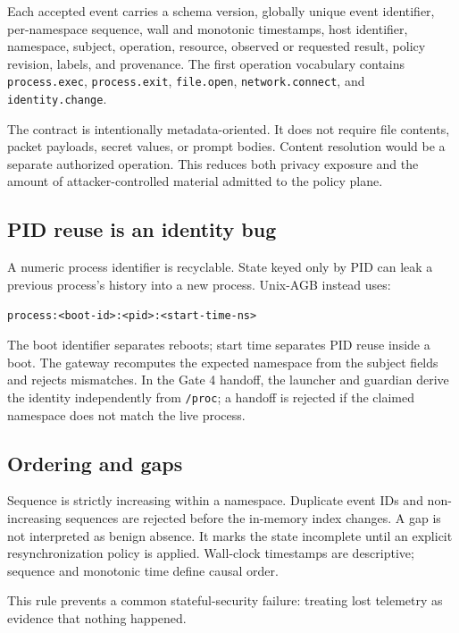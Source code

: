 \documentclass[11pt,a4paper]{article}
\begin{document}
Each accepted event carries a schema version, globally unique event identifier,
per-namespace sequence, wall and monotonic timestamps, host identifier,
namespace, subject, operation, resource, observed or requested result, policy
revision, labels, and provenance. The first operation vocabulary contains
\texttt{process.exec}, \texttt{process.exit}, \texttt{file.open},
\texttt{network.connect}, and \texttt{identity.change}.

The contract is intentionally metadata-oriented. It does not require file
contents, packet payloads, secret values, or prompt bodies. Content resolution
would be a separate authorized operation. This reduces both privacy exposure
and the amount of attacker-controlled material admitted to the policy plane.

\subsection{PID reuse is an identity bug}

A numeric process identifier is recyclable. State keyed only by PID can leak a
previous process's history into a new process. Unix-AGB instead uses:

\begin{center}
\texttt{process:<boot-id>:<pid>:<start-time-ns>}
\end{center}

The boot identifier separates reboots; start time separates PID reuse inside a
boot. The gateway recomputes the expected namespace from the subject fields and
rejects mismatches. In the Gate 4 handoff, the launcher and guardian derive the
identity independently from \texttt{/proc}; a handoff is rejected if the
claimed namespace does not match the live process.

\subsection{Ordering and gaps}

Sequence is strictly increasing within a namespace. Duplicate event IDs and
non-increasing sequences are rejected before the in-memory index changes. A
gap is not interpreted as benign absence. It marks the state incomplete until
an explicit resynchronization policy is applied. Wall-clock timestamps are
descriptive; sequence and monotonic time define causal order.

This rule prevents a common stateful-security failure: treating lost telemetry
as evidence that nothing happened.
\end{document}
